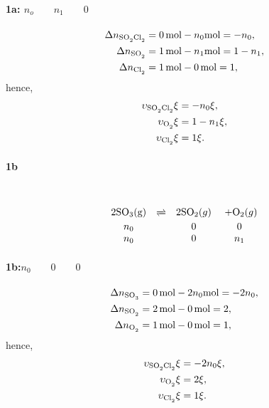\documentclass[main.tex]{subfiles}
\begin{document}
\paragraph{1a: $n_o\qquad n_1 \qquad 0$}
\begin{align*}
    \Delta n_{\ce{SO2Cl2}} &= \SI{0}{\mole} - n_0\SI{}{\mole} = -n_0, \\
    \Delta n_{\ce{SO2}} &= \SI{1}{\mole} - n_1\SI{}{\mole} = 1-n_1, \\
    \Delta n_{\ce{Cl2}} &= \SI{1}{\mole} - \SI{0}{\mole} = 1,
\end{align*}
hence,
\begin{align*}
    \upsilon_{\ce{SO2Cl2}}\xi &= -n_0\xi, \\
    \upsilon_{\ce{O2}}\xi &= 1-n_1\xi, \\
    \upsilon_{\ce{Cl2}}\xi &= 1\xi.
\end{align*}

\paragraph{1b}~%
\begin{gather*}
\begin{array}{cccc}
    2\mathrm{SO}_3(\mathrm{g}) & \xrightleftharpoons & 2\mathrm{SO}_2(g) &~+ \mathrm{O}_2(g) \\
    n_0 & & 0 & 0\\
    n_0 & & 0 & n_1\\
\end{array}    
\end{gather*}

\paragraph{1b:$n_0 \qquad 0 \qquad 0$}
\begin{align*}
    \Delta n_{\ce{SO3}} &= \SI{0}{\mole} - 2n_0\SI{}{\mole} = -2n_0, \\
    \Delta n_{\ce{SO2}} &= \SI{2}{\mole} - \SI{0}{\mole} = 2, \\
    \Delta n_{\ce{O2}} &= \SI{1}{\mole} - \SI{0}{\mole} = 1,
\end{align*}
hence,
\begin{align*}
    \upsilon_{\ce{SO2Cl2}}\xi &= -2n_0\xi, \\
    \upsilon_{\ce{O2}}\xi &= 2\xi, \\
    \upsilon_{\ce{Cl2}}\xi &= 1\xi.
\end{align*}
\end{document}
